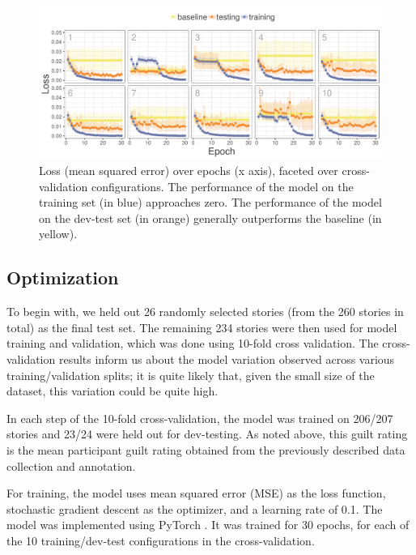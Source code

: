 \documentclass[11pt,a4paper]{article}
\begin{document}
\begin{figure}
  \includegraphics[width=\linewidth]{graphs/lossPlotCropped.pdf}
  \caption{Loss (mean squared error) over epochs (x axis), faceted over cross-validation configurations. The performance of the model on the training set (in blue) approaches zero. The performance of the model on the dev-test set (in orange) generally outperforms the baseline (in yellow).}
  \label{fig:loss}
\end{figure}

\subsection{Optimization}

To begin with, we held out 26 randomly selected stories (from the 260 stories in total) as the final test set. The remaining 234 stories were then used for model training and validation, which was done using 10-fold cross validation. The cross-validation results inform us about the model variation observed across  various training/validation splits; it is quite likely that, given the small size of the dataset, this variation could be quite high.

In each step of the 10-fold cross-validation, the model was trained on 206/207 stories and 23/24 were held out for dev-testing. As noted above, this guilt rating is the mean participant guilt rating obtained from the previously described data collection and annotation.

For training, the model uses mean squared error (MSE) as the loss function, stochastic gradient descent as the optimizer, and a learning rate of 0.1. The model was implemented using PyTorch \citep{Paszke:2017}. It was trained for 30 epochs, for each of the 10 training/dev-test configurations in the cross-validation.

\end{document}
